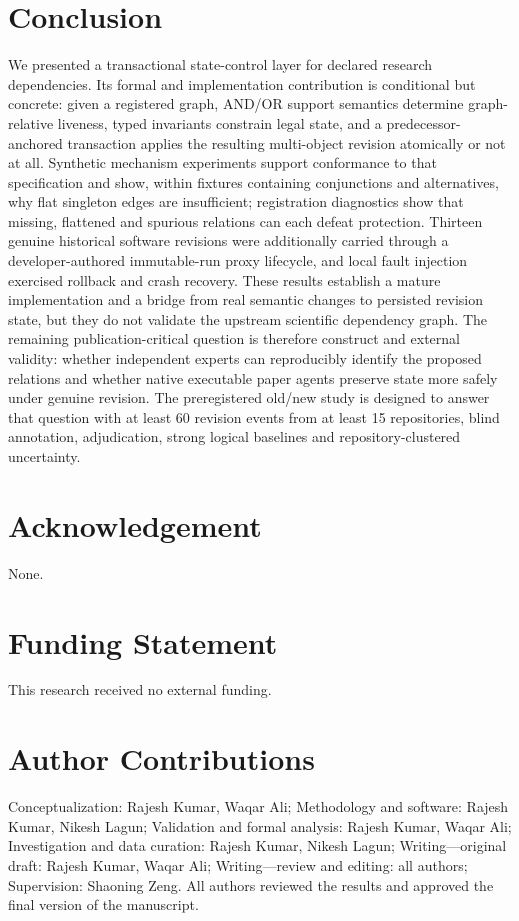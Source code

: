 \documentclass[journal]{IEEEtran}
\begin{document}
\section{Conclusion}
We presented a transactional state-control layer for declared research dependencies. Its formal and implementation contribution is conditional but concrete: given a registered graph, AND/OR support semantics determine graph-relative liveness, typed invariants constrain legal state, and a predecessor-anchored transaction applies the resulting multi-object revision atomically or not at all. Synthetic mechanism experiments support conformance to that specification and show, within fixtures containing conjunctions and alternatives, why flat singleton edges are insufficient; registration diagnostics show that missing, flattened and spurious relations can each defeat protection. Thirteen genuine historical software revisions were additionally carried through a developer-authored immutable-run proxy lifecycle, and local fault injection exercised rollback and crash recovery. These results establish a mature implementation and a bridge from real semantic changes to persisted revision state, but they do not validate the upstream scientific dependency graph. The remaining publication-critical question is therefore construct and external validity: whether independent experts can reproducibly identify the proposed relations and whether native executable paper agents preserve state more safely under genuine revision. The preregistered old/new study is designed to answer that question with at least 60 revision events from at least 15 repositories, blind annotation, adjudication, strong logical baselines and repository-clustered uncertainty.

\section*{Acknowledgement}
None.

\section*{Funding Statement}
This research received no external funding.

\section*{Author Contributions}
Conceptualization: Rajesh Kumar, Waqar Ali; Methodology and software: Rajesh Kumar, Nikesh Lagun; Validation and formal analysis: Rajesh Kumar, Waqar Ali; Investigation and data curation: Rajesh Kumar, Nikesh Lagun; Writing---original draft: Rajesh Kumar, Waqar Ali; Writing---review and editing: all authors; Supervision: Shaoning Zeng. All authors reviewed the results and approved the final version of the manuscript.
\end{document}
